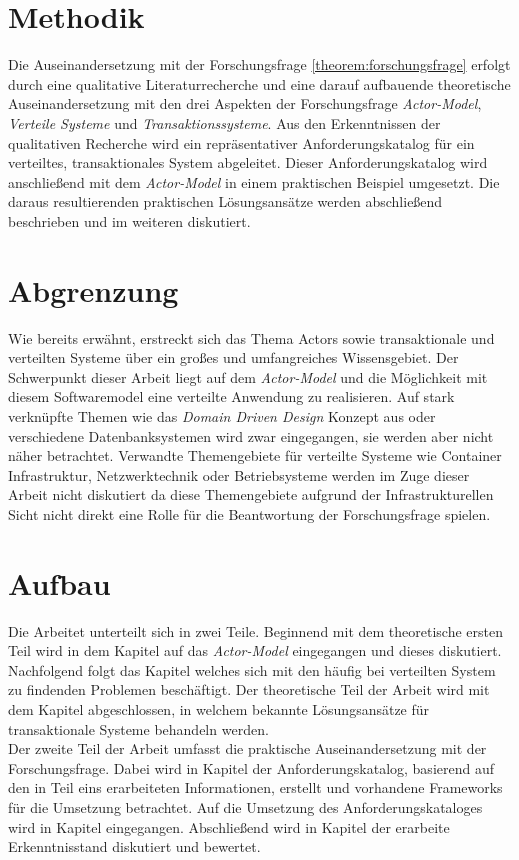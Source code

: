 \section{Methodik}
Die Auseinandersetzung mit der Forschungsfrage \ref{theorem:forschungsfrage} erfolgt durch eine qualitative Literaturrecherche und eine darauf aufbauende theoretische Auseinandersetzung mit den drei Aspekten der Forschungsfrage \textit{Actor-Model}, \textit{Verteile Systeme} und \textit{Transaktionssysteme}. Aus den Erkenntnissen der qualitativen Recherche wird ein repräsentativer Anforderungskatalog für ein verteiltes, transaktionales System abgeleitet. Dieser Anforderungskatalog wird anschließend mit dem \textit{Actor-Model} in einem praktischen Beispiel umgesetzt. Die daraus resultierenden praktischen Lösungsansätze werden abschließend beschrieben und im weiteren diskutiert.
 
\section{Abgrenzung}
Wie bereits erwähnt, erstreckt sich das Thema Actors sowie transaktionale und verteilten Systeme über ein großes und umfangreiches Wissensgebiet. Der Schwerpunkt dieser Arbeit liegt auf dem \textit{Actor-Model} und die Möglichkeit mit diesem Softwaremodel eine verteilte Anwendung zu realisieren. Auf stark verknüpfte Themen wie das \textit{Domain Driven Design} Konzept aus \cite{Evans2004Domain-drivenSoftware} oder verschiedene Datenbanksystemen wird zwar eingegangen, sie werden aber nicht näher betrachtet. Verwandte Themengebiete für verteilte Systeme wie Container Infrastruktur, Netzwerktechnik oder Betriebsysteme werden im Zuge dieser Arbeit nicht diskutiert da diese Themengebiete aufgrund der Infrastrukturellen Sicht nicht direkt eine Rolle für die Beantwortung der Forschungsfrage spielen. 

\section{Aufbau}
Die Arbeitet unterteilt sich in zwei Teile. Beginnend mit dem theoretische ersten Teil wird in dem Kapitel  auf das \textit{Actor-Model} eingegangen und dieses diskutiert. Nachfolgend folgt das Kapitel  welches sich mit den häufig bei verteilten System zu findenden Problemen beschäftigt. Der theoretische Teil der Arbeit wird mit dem Kapitel  abgeschlossen, in welchem bekannte Lösungsansätze für transaktionale Systeme behandeln werden. \\
Der zweite Teil der Arbeit umfasst die praktische Auseinandersetzung mit der Forschungsfrage. Dabei wird in Kapitel  der Anforderungskatalog, basierend auf den in Teil eins erarbeiteten Informationen, erstellt und vorhandene Frameworks für die Umsetzung betrachtet. Auf die Umsetzung des Anforderungskataloges wird in Kapitel  eingegangen. Abschließend wird in Kapitel  der erarbeite Erkenntnisstand diskutiert und bewertet.  